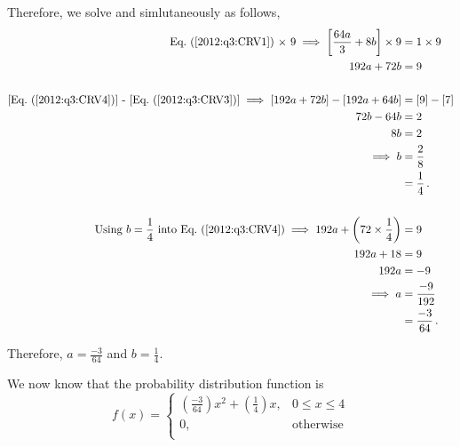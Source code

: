 \begin{subquestions}
\begin{subsubquestions}
Therefore, we solve  and  simlutaneously as follows,
\begin{align}
	\text{\req{2012:q3:CRV1} $\times$ 9} \implies \left[ \frac{64a}{3} + 8b \right] \times 9 & = 1 \times 9 \nn \\
	                                                   192a + 72b & = 9 \label{2012:q3:CRV4} \\ 
	                                                   \nn \\
	\text{[\req{2012:q3:CRV4}] - [\req{2012:q3:CRV3}]} \implies \left[ 192a + 72b \right] - \left[192a + 64b \right]  & = [9]-[7] \nn \\
		                                                               72b-64b & = 2 \nn \\
		                                                               8b & = 2 \nn \\
		                                                               \implies b & = \frac{2}{8} \nn \\
		                                                                          & = \frac{1}{4} \,. \\ \nn \\
\text{Using $b=\frac{1}{4}$ into \req{2012:q3:CRV4}} \implies 192a + \left (72 \times \frac{1}{4} \right) & = 9 \nn \\
                                                                    192a + 18 & = 9 \nn \\
                                                                    192a & = -9 \nn \\ 
                                                                   \implies a & = \frac{-9}{192} \nn \\
                                                                   & = \frac{-3}{64} \,.
\end{align}

Therefore, $a= \frac{-3}{64}$ and $b=\frac{1}{4}$.


\subsubquestion 

We now know that the probability distribution function is 
\[
f(x) =
\begin{cases}
	\left(\frac{-3}{64}\right)x^2+\left(\frac{1}{4}\right)x, & \text{$0 \leq x \leq 4$} \\
	0,       & \text{otherwise} \\
\end{cases}
\]


\end{subsubquestions}
\end{subquestions}
